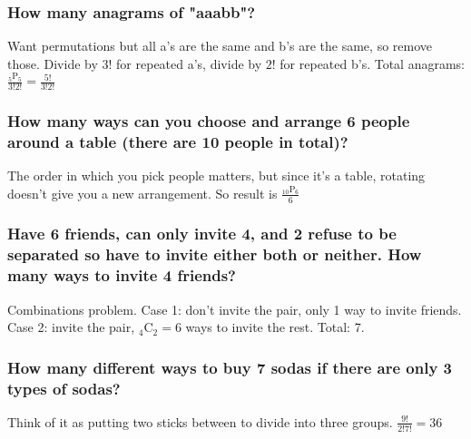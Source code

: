 \documentclass[12pt, leqno]{article}
\newcommand{\perm}[2]{{}_{#1}\mathrm{P}_{#2}}
\newcommand{\comb}[2]{{}_{#1}\mathrm{C}_{#2}}
\begin{document}
\subsubsection*{How many anagrams of "aaabb"?}

Want permutations but all a's are the same and b's are the same, so remove those. Divide by $3!$ for repeated a's, divide by $2!$ for repeated b's. Total anagrams: $\frac{\perm{5}{5}}{3!2!} = \frac{5!}{3!2!}$

\subsubsection*{How many ways can you choose and arrange 6 people around a table (there are 10 people in total)?}

The order in which you pick people matters, but since it's a table, rotating doesn't give you a new arrangement. So result is $\frac{\perm{10}{6}}{6}$

\subsubsection*{Have 6 friends, can only invite 4, and 2 refuse to be separated so have to invite either both or neither. How many ways to invite 4 friends?}

Combinations problem. Case 1: don't invite the pair, only 1 way to invite friends. Case 2: invite the pair, $\comb{4}{2} = 6$ ways to invite the rest. Total: 7.

\subsubsection*{How many different ways to buy 7 sodas if there are only 3 types of sodas?}

Think of it as putting two sticks between to divide into three groups. $\frac{9!}{2!7!} = 36$
\end{document}
